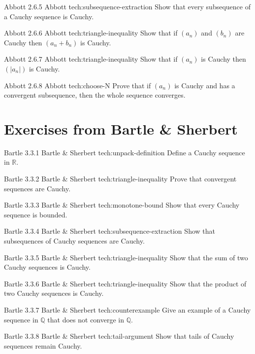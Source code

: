 \cauchyex
{Abbott 2.6.5}
{Abbott}
{tech:subsequence-extraction}
{Show that every subsequence of a Cauchy sequence is Cauchy.}

\cauchyex
{Abbott 2.6.6}
{Abbott}
{tech:triangle-inequality}
{Show that if $(a_n)$ and $(b_n)$ are Cauchy then $(a_n+b_n)$ is Cauchy.}

\cauchyex
{Abbott 2.6.7}
{Abbott}
{tech:triangle-inequality}
{Show that if $(a_n)$ is Cauchy then $(|a_n|)$ is Cauchy.}

\cauchyex
{Abbott 2.6.8}
{Abbott}
{tech:choose-N}
{Prove that if $(a_n)$ is Cauchy and has a convergent subsequence, then the whole sequence converges.}


\section*{Exercises from Bartle \& Sherbert}

\cauchyex
{Bartle 3.3.1}
{Bartle \& Sherbert}
{tech:unpack-definition}
{Define a Cauchy sequence in $\mathbb{R}$.}

\cauchyex
{Bartle 3.3.2}
{Bartle \& Sherbert}
{tech:triangle-inequality}
{Prove that convergent sequences are Cauchy.}

\cauchyex
{Bartle 3.3.3}
{Bartle \& Sherbert}
{tech:monotone-bound}
{Show that every Cauchy sequence is bounded.}

\cauchyex
{Bartle 3.3.4}
{Bartle \& Sherbert}
{tech:subsequence-extraction}
{Show that subsequences of Cauchy sequences are Cauchy.}

\cauchyex
{Bartle 3.3.5}
{Bartle \& Sherbert}
{tech:triangle-inequality}
{Show that the sum of two Cauchy sequences is Cauchy.}

\cauchyex
{Bartle 3.3.6}
{Bartle \& Sherbert}
{tech:triangle-inequality}
{Show that the product of two Cauchy sequences is Cauchy.}

\cauchyex
{Bartle 3.3.7}
{Bartle \& Sherbert}
{tech:counterexample}
{Give an example of a Cauchy sequence in $\mathbb{Q}$ that does not converge in $\mathbb{Q}$.}

\cauchyex
{Bartle 3.3.8}
{Bartle \& Sherbert}
{tech:tail-argument}
{Show that tails of Cauchy sequences remain Cauchy.}


